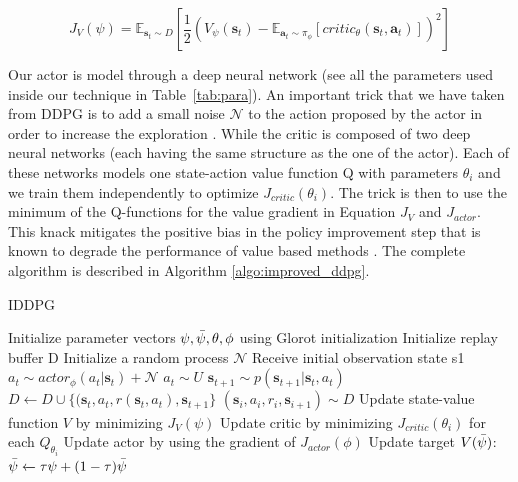 \begin{equation}
    J_V(\psi) = \mathbb E_{\textbf{s}_t \sim D}[\frac{1}{2}(V_{\psi}(\textbf{s}_t) -  \mathbb E_{\textbf{a}_t \sim \pi_{\phi}}[critic_{ \theta}(\textbf{s}_t, \textbf{a}_t)])^2 ]
    \label{eq:resiErr}
\end{equation}

Our actor is model through a deep neural network (see all the parameters used inside our technique in Table~\ref{tab:para}). An important trick that we have taken from DDPG is to add a small noise $\mathcal{N}$ to the action proposed by the actor in order to increase the exploration \cite{ddpg}. While the critic is composed of two deep neural networks (each having the same structure as the one of the actor). Each of these networks models one state-action value function Q with parameters $\theta_i$ and we train them independently to optimize $J_{critic}(\theta_i)$. The trick is then to use the minimum of the Q-functions for the value gradient in Equation $J_V$ and $J_{actor}$. This knack mitigates the positive bias in the policy improvement step that is known to degrade the performance of value based methods \cite{posOverEsti}. The complete algorithm is described in Algorithm \ref{algo:improved_ddpg}.\\

{\centering
\begin{minipage}{.6\linewidth}
  \begin{algorithm}[H]
\caption{IDDPG}
\begin{algorithmic} 
  \label{algo:improved_ddpg}
\STATE Initialize parameter vectors $\psi, \Bar{\psi}, \theta, \phi$ using Glorot initialization
\STATE Initialize replay buffer D
\STATE Initialize a random process $\mathcal{N}$
\STATE Receive initial observation state s1
\STATE $a_t \sim actor_{\phi}(a_t|\textbf{s}_t) +  \mathcal{N}$
\ELSE
\STATE $a_t \sim U$ 
\ENDIF
\STATE $\textbf{s}_{t+1} \sim p(\textbf{s}_{t+1}|\textbf{s}_t, a_t)$
\STATE  $D \xleftarrow[]{} D \cup \{(\textbf{s}_t, a_t, r(\textbf{s}_t, a_t), \textbf{s}_{t+1}\}$
\STATE  $(\textbf{s}_i, a_i, r_i,\textbf{s}_{i+1}) \sim D$
\STATE Update state-value function $V$ by minimizing $J_V(\psi)$ 
\STATE Update critic by minimizing $J_{critic}(\theta_i)$ for each $Q_{\theta_i}$ 
\STATE  Update actor by using the gradient of $J_{actor}(\phi)$
\STATE Update target $V(\Bar{\psi})$: $\Bar{\psi} \xleftarrow[]{} \tau \psi + (1-\tau) \Bar{\psi}$ 
\ENDFOR
\ENDFOR
\end{algorithmic}
\end{algorithm}
\end{minipage}
\par
} 
\vspace{0.7cm}

